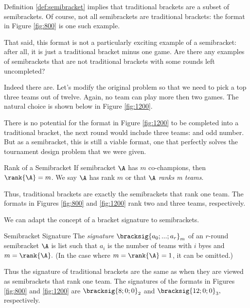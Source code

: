 {    Definition \ref{def:semibracket} implies that traditional brackets are a subset of semibrackets. Of course, not all semibrackets are traditional brackets: the format in Figure \ref{fig:800} is one such example.

    That said, this format is not a particularly exciting example of a semibracket: after all, it is just a traditional bracket minus one game. Are there any examples of semibrackets that are not traditional brackets with some rounds left uncompleted?

    Indeed there are. Let's modify the original problem so that we need to pick a top three teams out of twelve. Again, no team can play more then two games. The natural choice is shown below in Figure \ref{fig:1200}.
    

    There is no potential for the format in Figure \ref{fig:1200} to be completed into a traditional bracket, the next round would include three teams: and odd number. But as a semibracket, this is still a viable format, one that perfectly solves the tournament design problem that we were given.
    
    \begin{definition}{Rank of a Semibracket}{}
        If semibracket $\A$ has $m$ co-champions, then $\rank{\A} = m$. We say $\A$ has rank $m$ or that $\A$ \textit{ranks m teams}.
    \end{definition}

    Thus, traditional brackets are exactly the semibrackets that rank one team. The formats in Figures \ref{fig:800} and \ref{fig:1200} rank two and three teams, respectively.

    We can adapt the concept of a bracket signature to semibrackets.

    \begin{definition}{Semibracket Signature}{}
        The \textit{signature} $\bracksig{a_0; ...; a_r}_m$ of an $r$-round semibracket $\A$ is list such that $a_i$ is the number of teams with $i$ byes and $m = \rank{\A}.$ (In the case where $m = \rank{\A} = 1$, it can be omitted.)
    \end{definition}

    Thus the signature of traditional brackets are the same as when they are viewed as semibrackets that rank one team. The signatures of the formats in Figures \ref{fig:800} and \ref{fig:1200} are $\bracksig{8;0;0}_2$ and $\bracksig{12;0;0}_3,$ respectively.

}
